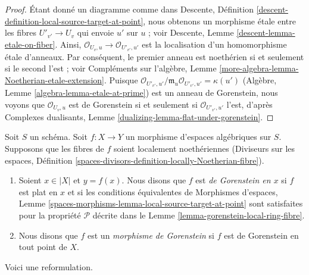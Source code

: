 \begin{proof}
Étant donné un diagramme comme dans
Descente, Définition \ref{descent-definition-local-source-target-at-point},
nous obtenons un morphisme étale entre les fibres
$U'_{v'} \to U_v$ qui envoie $u'$ sur $u$ ; voir
Descente, Lemme \ref{descent-lemma-etale-on-fiber}.
Ainsi, $\mathcal{O}_{U_v, u} \to \mathcal{O}_{U'_{v'}, u'}$
est la localisation d'un homomorphisme étale d'anneaux. Par conséquent,
le premier anneau est noethérien si et seulement si le second l'est ; voir
Compléments sur l'algèbre, Lemme \ref{more-algebra-lemma-Noetherian-etale-extension}.
Puisque $\mathcal{O}_{U'_{v'}, u'}/\mathfrak m_u \mathcal{O}_{U'_{v'}, u'}
= \kappa(u')$ (Algèbre, Lemme \ref{algebra-lemma-etale-at-prime})
est un anneau de Gorenstein, nous voyons que
$\mathcal{O}_{U_v, u}$ est de Gorenstein si et seulement si
$\mathcal{O}_{U'_{v'}, u'}$ l'est, d'après
Complexes dualisants, Lemme \ref{dualizing-lemma-flat-under-gorenstein}.
\end{proof}

\begin{definition}
\label{definition-gorenstein}
Soit $S$ un schéma.
Soit $f : X \to Y$ un morphisme d'espaces algébriques sur $S$.
Supposons que les fibres de $f$ soient localement noethériennes
(Diviseurs sur les espaces, Définition
\ref{spaces-divisors-definition-locally-Noetherian-fibre}).
\begin{enumerate}
\item Soient $x \in |X|$ et $y = f(x)$. Nous disons que $f$ est
{\it de Gorenstein en $x$} si $f$ est plat en $x$ et si
les conditions équivalentes de
Morphismes d'espaces, Lemme
\ref{spaces-morphisms-lemma-local-source-target-at-point}
sont satisfaites pour la propriété $\mathcal{P}$ décrite dans le
Lemme \ref{lemma-gorenstein-local-ring-fibre}.
\item Nous disons que $f$ est un {\it morphisme de Gorenstein} si $f$ est
de Gorenstein en tout point de $X$.
\end{enumerate}
\end{definition}

\noindent
Voici une reformulation.

